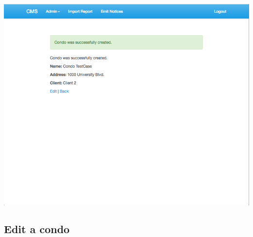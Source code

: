 \begin{itemize}
    \includegraphics[scale=0.25]{./images/ss/condo/create/5.png}
\end{itemize}

\subsection*{Edit a condo}

